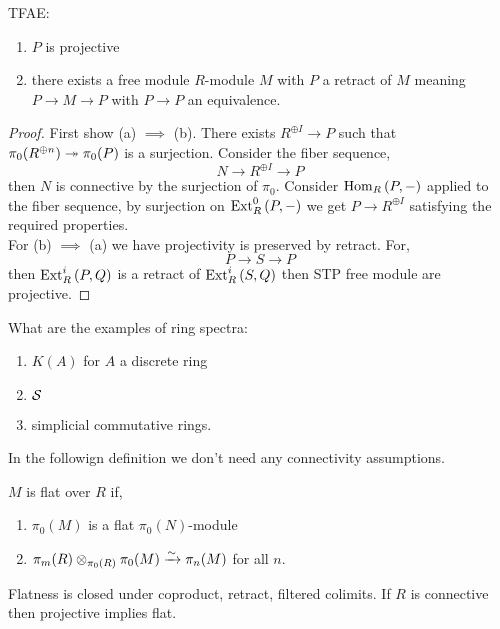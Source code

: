 \documentclass[12pt]{article}
\begin{document}
\begin{prop}
TFAE:
\begin{enumerate}
\item $P$ is projective

\item there exists a free module $R$-module $M$ with $P$ a retract of $M$ meaning $P \to M \to P$ with $P \to P$ an equivalence. 
\end{enumerate}
\end{prop}

\begin{proof}
First show (a) $\implies$ (b). There exists $R^{\oplus I} \to P$ such that $\pi_0(R^{\oplus n}) \onto \pi_0(P)$ is a surjection. Consider the fiber sequence,
\[ N \to R^{\oplus I} \to P \]
then $N$ is connective by the surjection of $\pi_0$. Consider $\Hom{R}{P}{-}$ applied to the fiber sequence, by surjection on $\Ext{0}{R}{P}{-}$ we get $P \to R^{\oplus I}$ satisfying the required properties. 
\bigskip\\
For (b) $\implies$ (a) we have projectivity is preserved by retract. For,
\[ P \to S \to P \]
then $\Ext{i}{R}{P}{Q}$ is a retract of $\Ext{i}{R}{S}{Q}$ then STP free module are projective.  
\end{proof}

\begin{rmk}
What are the examples of ring spectra:
\begin{enumerate}
\item $K(A)$ for $A$ a discrete ring
\item $\S$
\item simplicial commutative rings.
\end{enumerate}
\end{rmk}

\begin{rmk}
In the followign definition we don't need any connectivity assumptions.
\end{rmk}

\begin{defn}
$M$ is flat over $R$ if,
\begin{enumerate}
\item $\pi_0(M)$ is a flat $\pi_0(N)$-module
\item $\pi_m(R) \ot_{\pi_0(R)} \pi_0(M) \iso \pi_n(M)$ for all $n$.
\end{enumerate}
\end{defn}

\begin{rmk}
Flatness is closed under coproduct, retract, filtered colimits. If $R$ is connective then projective implies flat. 
\end{rmk}
\end{document}
